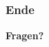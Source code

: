 \documentclass{beamer}
\newcommand{\step}[2][]{\ensuremath{\overset{{#1} (\text{#2})}{=}}}
\newcommand*{\astep}[2][]{\ensuremath{\overset{{#1} (\text{#2})}&{=}}}
\begin{document}
%	
%
%	
%	
%
%	

\begin{frame} \frametitle{Ende}
	\centering
	\textbf{Fragen?}
\end{frame}
\end{document}
